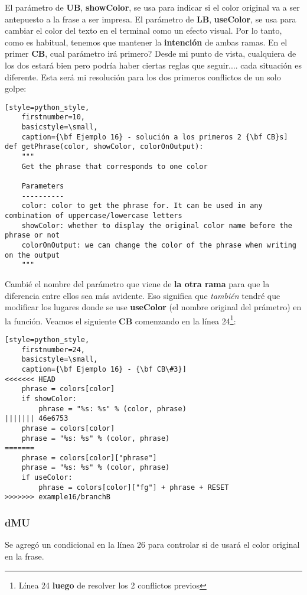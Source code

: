 El parámetro de {\bf UB}, {\bf showColor}, se usa para indicar si el color original va a ser antepuesto a la frase a ser impresa. El
parámetro de {\bf LB}, {\bf useColor}, se usa para cambiar el color del texto en el terminal como un efecto visual. Por lo tanto, como
es habitual, tenemos que mantener la {\bf intención} de ambas ramas. En el primer {\bf CB}, cual parámetro irá primero?
Desde mi punto de vista, cualquiera de los dos estará bien pero podría haber ciertas reglas que seguir.... cada situación es diferente.
Esta será mi resolución para los dos primeros conflictos de un solo golpe:

\begin{lstlisting}[style=python_style,
	firstnumber=10,
	basicstyle=\small,
	caption={\bf Ejemplo 16} - solución a los primeros 2 {\bf CB}s]
def getPhrase(color, showColor, colorOnOutput):
    """
    Get the phrase that corresponds to one color
    
    Parameters
    ----------
    color: color to get the phrase for. It can be used in any combination of uppercase/lowercase letters
    showColor: whether to display the original color name before the phrase or not
    colorOnOutput: we can change the color of the phrase when writing on the output
    """
\end{lstlisting}

Cambié el nombre del parámetro que viene de {\bf la otra rama} para que la diferencia entre ellos sea más avidente. Eso significa que
{\it también} tendré que modificar los lugares donde se use {\bf useColor} (el nombre original del prámetro) en la función.
Veamos el siguiente {\bf CB} comenzando en la línea 24\footnote{Línea 24 {\bf luego} de resolver los 2 conflictos previos}:

\begin{lstlisting}[style=python_style,
	firstnumber=24,
	basicstyle=\small,
	caption={\bf Ejemplo 16} - {\bf CB\#3}]
<<<<<<< HEAD
    phrase = colors[color]
    if showColor:
        phrase = "%s: %s" % (color, phrase)
||||||| 46e6753
    phrase = colors[color]
    phrase = "%s: %s" % (color, phrase)
=======
    phrase = colors[color]["phrase"]
    phrase = "%s: %s" % (color, phrase)
    if useColor:
        phrase = colors[color]["fg"] + phrase + RESET
>>>>>>> example16/branchB
\end{lstlisting}

\subsubsection{dMU}
Se agregó un condicional en la línea 26 para controlar si de usará el color original en la frase.

